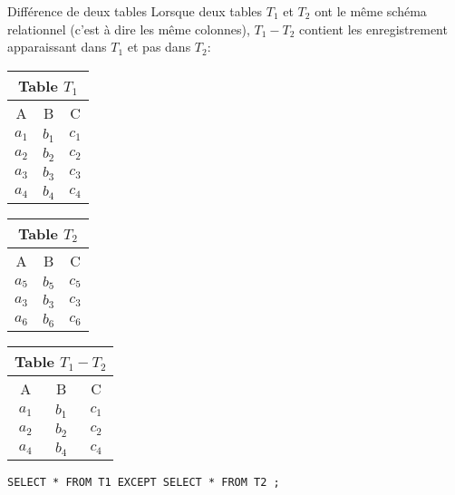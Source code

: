 \documentclass[10pt]{beamer}
\begin{document}
\begin{frame}
	\begin{block}{Différence de deux tables}
		Lorsque deux tables $T_1$ et $T_2$ ont \textcolor{BrickRed}{le même schéma relationnel} (c'est à dire les même colonnes), $T_1 - T_2$ contient les enregistrement apparaissant dans $T_1$ et pas dans $T_2$:
		\begin{center}
			\begin{tabular}{|c|c|c|}
				\multicolumn{3}{c}{\textcolor{Sepia}{Table $T_1$}} \\
				\hline
				\rowcolor{lightgray} A & B     & C                 \\
				\hline
				$a_1$                  & $b_1$ & $c_1$             \\
				\hline
				$a_2$                  & $b_2$ & $c_2$             \\
				\hline
				$a_3$                  & $b_3$ & $c_3$             \\
				\hline
				$a_4$                  & $b_4$ & $c_4$             \\
				\hline
			\end{tabular} \quad \quad
			\begin{tabular}{|c|c|c|}
				\multicolumn{3}{c}{\textcolor{Sepia}{Table $T_2$}} \\
				\hline
				\rowcolor{lightgray} A & B     & C                 \\
				\hline
				$a_5$                  & $b_5$ & $c_5$             \\
				\hline
				$a_3$                  & $b_3$ & $c_3$             \\
				\hline
				$a_6$                  & $b_6$ & $c_6$             \\
				\hline
			\end{tabular}
			\quad \quad
			\begin{tabular}{|c|c|c|}
				\multicolumn{3}{c}{\textcolor{Sepia}{Table $T_1 - T_2$}} \\
				\hline
				\rowcolor{lightgray} A & B     & C                       \\
				\hline
				$a_1$                  & $b_1$ & $c_1$                   \\
				\hline
				$a_2$                  & $b_2$ & $c_2$                   \\
				\hline
				$a_4$                  & $b_4$ & $c_4$                   \\
				\hline
			\end{tabular}
		\end{center} \medskip
		\texttt{SELECT * FROM T1 EXCEPT SELECT * FROM T2 ;}
	\end{block}
\end{frame}
\end{document}
